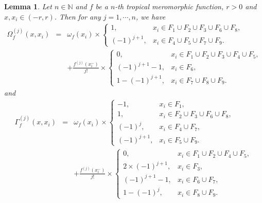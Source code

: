 \documentclass{article}
\newtheorem{lemma}[defin]{Lemma}
\begin{document}
\begin{lemma}\label{lemma3.2}
Let $n\in\mathbb{N}$ and $f$ be a $n$-th tropical meromorphic function, $r>0$ and $x, x_{i} \in(-r, r)$. Then for any $j=1, \cdots, n$, we have
    \begin{eqnarray*}
        \Omega_{f}^{(j)}(x, x_{i})&=& \omega_{f}(x_{i})\times\left\{\begin{array}{ll}
         1, & x_{i}\in F_{1}\cup F_{2} \cup F_{3} \cup F_{6} \cup F_{8},\\
         (-1)^{j+1}, & x_{i}\in F_{4}\cup F_{5} \cup F_{7} \cup F_{9}.
         \end{array}\right.\\
         &&+\frac{f^{(j)}(x_{i}^{-})}{j!}\times\left\{\begin{array}{ll}
         0, & x_{i}\in F_{1}\cup F_{2} \cup F_{3} \cup F_{4} \cup F_{5},\\
         (-1)^{j+1}-1, & x_{i}\in F_{6},\\
         1-(-1)^{j+1}, & x_{i}\in F_{7}\cup F_{8} \cup F_{9}.
         \end{array}\right.
    \end{eqnarray*}
    and
    \begin{eqnarray*}
        \Gamma_{f}^{(j)}(x, x_{i})&=& \omega_{f}(x_{i})\times\left\{\begin{array}{ll}
         -1, & x_{i}\in F_{1},\\
         1, & x_{i}\in F_{2}\cup F_{3} \cup F_{6} \cup F_{8},\\
         (-1)^{j}, & x_{i}\in F_{4}\cup F_{7},\\ (-1)^{j+1}, & x_{i}\in F_{5} \cup F_{9}.
         \end{array}\right.\\
         &&+\frac{f^{(j)}(x_{i}^{-})}{j!}\times\left\{\begin{array}{ll}
         0, & x_{i}\in F_{1}\cup F_{2} \cup F_{4} \cup F_{5},\\
         2\times(-1)^{j+1}, & x_{i}\in F_{3},\\
         (-1)^{j+1}-1, & x_{i}\in F_{6}\cup F_{7},\\
         1-(-1)^{j}, & x_{i}\in F_{8} \cup F_{9}.
         \end{array}\right.
    \end{eqnarray*}
\end{lemma}
\end{document}
